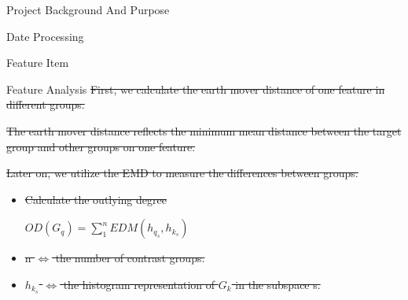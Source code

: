 \documentclass[
 size=14pt,
 paper=smartboard,  %
 mode=present, 		%
 display=slides, 	%
 style=tuliplab,  	%
 pauseslide,
 fleqn,leqno]{powerdot}
\providecommand{\DIFdeltex}[1]{{\protect\color{red}\sout{#1}}}                      %
\providecommand{\DIFdel}[1]{\texorpdfstring{\DIFdeltex{#1}}{}} %
\begin{document}
\begin{slide}
\begin{slide}{Project Background And Purpose}
\begin{slide}{Date Processing}
\begin{slide}{Feature Item}
\begin{slide}[toc=,bm=]{Feature Analysis}
\DIFdel{First,
we calculate the earth mover distance of one feature in different groups.
}%

\DIFdel{The earth mover distance reflects the minimum mean distance between
the target group and other groups on one feature.
}%

\DIFdel{Later on,
we utilize the EMD to measure the differences between groups.
}%



\begin{itemize}%
\item%
\DIFdel{Calculate the outlying degree
}%



\DIFdel{$ OD(G_q) = \sum_{1}^{n}EDM(h_{q_s}, h_{k_s}) $
}%


\item%
\DIFdel{n $\Leftrightarrow$ the number of contrast groups.
}%

\item%
\DIFdel{$h_{k_s}$  $\Leftrightarrow$ the histogram representation of $G_k$ in the subspace s.
}%



\end{itemize}
\end{slide}
\end{slide}
\end{slide}
\end{slide}
\end{slide}
\end{document}
